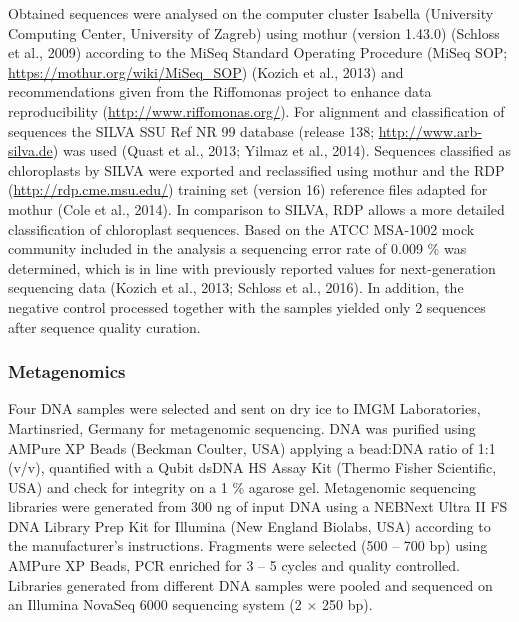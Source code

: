 \documentclass[12pt,]{article}
\begin{document}
Obtained sequences were analysed on the computer cluster Isabella
(University Computing Center, University of Zagreb) using mothur
(version 1.43.0) (Schloss et al., 2009) according to the MiSeq Standard
Operating Procedure (MiSeq SOP; \url{https://mothur.org/wiki/MiSeq_SOP})
(Kozich et al., 2013) and recommendations given from the Riffomonas
project to enhance data reproducibility
(\url{http://www.riffomonas.org/}). For alignment and classification of
sequences the SILVA SSU Ref NR 99 database (release 138;
\url{http://www.arb-silva.de}) was used (Quast et al., 2013; Yilmaz et
al., 2014). Sequences classified as chloroplasts by SILVA were exported
and reclassified using mothur and the RDP
(\url{http://rdp.cme.msu.edu/}) training set (version 16) reference
files adapted for mothur (Cole et al., 2014). In comparison to SILVA,
RDP allows a more detailed classification of chloroplast sequences.
Based on the ATCC MSA-1002 mock community included in the analysis a
sequencing error rate of 0.009 \si{\percent} was determined, which is in
line with previously reported values for next-generation sequencing data
(Kozich et al., 2013; Schloss et al., 2016). In addition, the negative
control processed together with the samples yielded only 2 sequences
after sequence quality curation.

\hypertarget{metagenomics}{%
\subsubsection{Metagenomics}\label{metagenomics}}

Four DNA samples were selected and sent on dry ice to IMGM Laboratories,
Martinsried, Germany for metagenomic sequencing. DNA was purified using
AMPure XP Beads (Beckman Coulter, USA) applying a bead:DNA ratio of 1:1
(v/v), quantified with a Qubit dsDNA HS Assay Kit (Thermo Fisher
Scientific, USA) and check for integrity on a 1 \si{\percent} agarose
gel. Metagenomic sequencing libraries were generated from 300 \si{\ng}
of input DNA using a NEBNext Ultra II FS DNA Library Prep Kit for
Illumina (New England Biolabs, USA) according to the manufacturer's
instructions. Fragments were selected (500 -- 700 bp) using AMPure XP
Beads, PCR enriched for 3 -- 5 cycles and quality controlled. Libraries
generated from different DNA samples were pooled and sequenced on an
Illumina NovaSeq 6000 sequencing system (2 × 250 bp).
\end{document}
